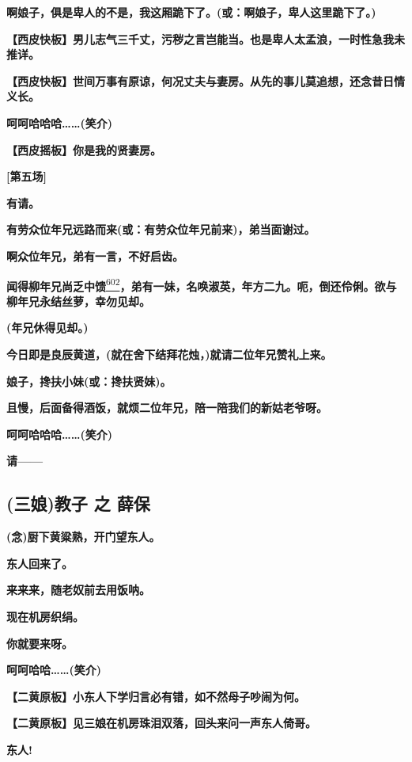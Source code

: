 \textbf{啊娘子，俱是卑人的不是，我这厢跪下了。(或：啊娘子，卑人这里跪下了。)}

\textbf{【西皮快板】男儿志气三千丈，污秽之言岂能当。也是卑人太孟浪，一时性急我未推详。}

\textbf{【西皮快板】世间万事有原谅，何况丈夫与妻房。从先的事儿莫追想，还念昔日情义长。}

\textbf{呵呵哈哈哈\ldots{}\ldots{}(笑介)}

\textbf{【西皮摇板】你是我的贤妻房。}

\textbf{{[}第五场{]}}

\textbf{有请。}

\textbf{有劳众位年兄远路而来(或：有劳众位年兄前来)，弟当面谢过。}

\textbf{啊众位年兄，弟有一言，不好启齿。}

\textbf{闻得柳年兄尚乏中馈}\protect\hyperlink{fn602}{\textsuperscript{602}}\textbf{，弟有一妹，名唤淑英，年方二九。呃，倒还伶俐。欲与柳年兄永结丝萝，幸勿见却。}

\textbf{(年兄休得见却。)}

\textbf{今日即是良辰黄道，(就在舍下结拜花烛，)就请二位年兄赞礼上来。}

\textbf{娘子，搀扶小妹(或：搀扶贤妹)。}

\textbf{且慢，后面备得酒饭，就烦二位年兄，陪一陪我们的新姑老爷呀。}

\textbf{呵呵哈哈哈\ldots{}\ldots{}(笑介)}

\textbf{请------}

\newpage
\hypertarget{ux4e09ux5a18ux6559ux5b50-ux4e4b-ux859bux4fdd}{%
\subsection{(三娘)教子 之
薛保}\label{ux4e09ux5a18ux6559ux5b50-ux4e4b-ux859bux4fdd}}

\textbf{(念)厨下黄粱熟，开门望东人。}

\textbf{东人回来了。}

\textbf{来来来，随老奴前去用饭呐。}

\textbf{现在机房织绢。}

\textbf{你就要来呀。}

\textbf{呵呵哈哈\ldots{}\ldots{}(笑介)}

\textbf{【二黄原板】小东人下学归言必有错，如不然母子吵闹为何。}

\textbf{【二黄原板】见三娘在机房珠泪双落，回头来问一声东人倚哥。}

\textbf{东人!}

